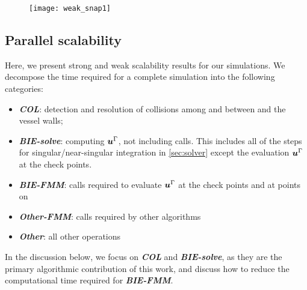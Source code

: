 

\begin{figure*}[!bht]
\centering
  \texttt{[image: weak\_snap1]}
\end{figure*}


\subsection{Parallel scalability}\label{ss:scalability}

  Here, we present strong and weak scalability results for our \rbc simulations. 
  We decompose the time required for a complete simulation into the following categories:%
 \begin{itemize}
    \item {\bf\em COL}: detection and resolution of collisions among
      \rbcs and between \rbcs and the vessel walls;
      \item {\bf\em BIE-solve}: computing ${\bm{u}}^{\Gamma}$, not including \fmm calls. This includes all of the steps for singular/near-singular integration in \cref{sec:solver} except the evaluation ${\bm{u}}^\Gamma$ at the check points.
      \item {\bf\em BIE-FMM}: \fmm calls required to evaluate ${\bm{u}}^{\Gamma}$ at the check points and at points on \rbcs
      \item {\bf\em Other-FMM}: \fmm calls required by other algorithms 
      \item {\bf\em Other}: all other operations
  \end{itemize}
In the discussion below, we focus on {\bf\em COL} and {\bf\em BIE-solve}, as
  they are the primary algorithmic contribution of this work, and discuss
  how to reduce the computational time required for {\bf\em BIE-FMM}.

